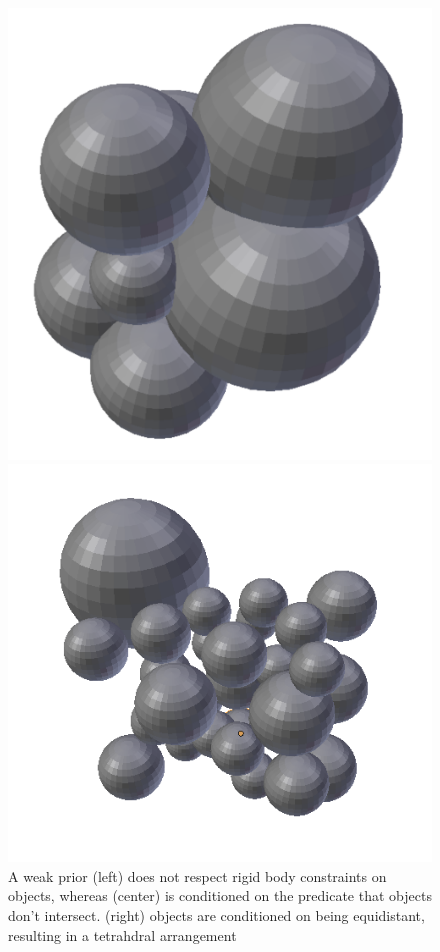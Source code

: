 \begin{figure}
	\centering
	\begin{minipage}[t]{5cm}
		\centering
		\includegraphics[width=0.45\linewidth]{figures/clunk}
	\end{minipage}%
	\begin{minipage}[t]{5cm}
		\centering
		\includegraphics[width=0.45\linewidth]{figures/render}
	\end{minipage}%
	\caption{A weak prior (left) does not respect rigid body constraints on objects, whereas (center) is conditioned on the predicate that objects don't intersect.  (right) objects are conditioned on being equidistant, resulting in a tetrahdral arrangement}
	\label{fig:nointersect}
\end{figure}


